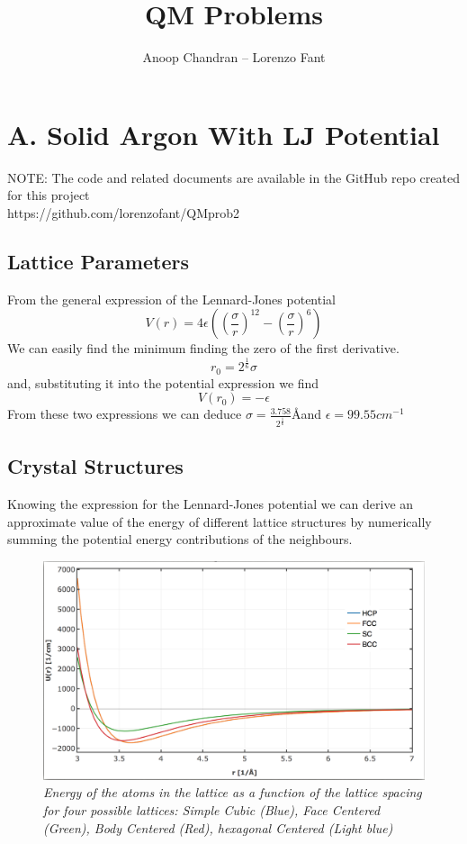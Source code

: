 \documentclass[a4paper]{article}
\title{QM Problems}
\author{Anoop Chandran -- Lorenzo Fant}
\begin{document}
\maketitle


\section{A. Solid Argon With LJ Potential}
NOTE: The code and related documents are available in the GitHub repo created for this project \\
https://github.com/lorenzofant/QMprob2
\subsection{Lattice Parameters}
From the general expression of the Lennard-Jones potential
\begin{equation}
V(r) = 4\epsilon\left(\left(\frac{\sigma}{r}\right)^12-\left(\frac{\sigma}{r}\right)^6\right)
\end{equation}
We can easily find the minimum finding the zero of the first derivative.
\begin{equation}
r_0 = 2^{\frac{1}{6}}\sigma
\end{equation}
and, substituting it into the potential expression we find
\begin{equation}
V(r_0) = -\epsilon
\end{equation}
From these two expressions we can deduce $\sigma = \frac{3.758}{2^{\frac{1}{6}}}$\AA and $\epsilon = 99.55 cm^{-1}$
\subsection{Crystal Structures}
Knowing the expression for the Lennard-Jones potential we can derive an approximate value of the energy of different lattice structures by numerically summing the potential energy contributions of the neighbours.
\begin{figure}[h]
    \centering
    \includegraphics[width=12cm]{lj.png}
    \caption{\it \label{en(spacing)}Energy of the atoms in the lattice as a function of the lattice spacing for four possible lattices: Simple Cubic (Blue), Face Centered (Green), Body Centered (Red), hexagonal Centered (Light blue)}
\end{figure}
    
\end{document}

